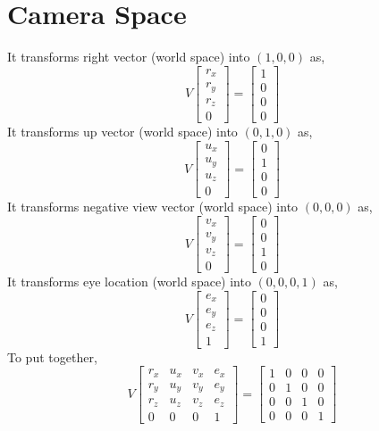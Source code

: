 \documentclass{article}
\begin{document}
\section*{Camera Space}
It transforms right vector (world space) into \((1, 0, 0)\) as,
\[V\begin{bmatrix}
    r_{x} \\ r_{y} \\ r_{z} \\ 0
\end{bmatrix}=\begin{bmatrix}
    1 \\ 0 \\ 0 \\ 0
\end{bmatrix}\]
It transforms up vector (world space) into \((0, 1, 0)\) as,
\[V\begin{bmatrix}
    u_{x} \\ u_{y} \\ u_{z} \\ 0
\end{bmatrix}=\begin{bmatrix}
    0 \\ 1 \\ 0 \\ 0
\end{bmatrix}\]
It transforms negative view vector (world space) into \((0, 0, 0)\) as,
\[V\begin{bmatrix}
    v_{x} \\ v_{y} \\ v_{z} \\ 0
\end{bmatrix}=\begin{bmatrix}
    0 \\ 0 \\ 1 \\ 0
\end{bmatrix}\]
It transforms eye location (world space) into \((0, 0, 0, 1)\) as,
\[V\begin{bmatrix}
    e_{x} \\ e_{y} \\ e_{z} \\ 1
\end{bmatrix}=\begin{bmatrix}
    0 \\ 0 \\ 0 \\ 1
\end{bmatrix}\]
To put together,
\[V\begin{bmatrix}
    r_{x} &u_{x} &v_{x} &e_{x} \\
    r_{y} &u_{y} &v_{y} &e_{y} \\
    r_{z} &u_{z} &v_{z} &e_{z} \\
    0 &0 &0 &1
\end{bmatrix}=\begin{bmatrix}
    1 &0 &0 &0 \\
    0 &1 &0 &0 \\
    0 &0 &1 &0 \\
    0 &0 &0 &1
\end{bmatrix}\]
\end{document}
